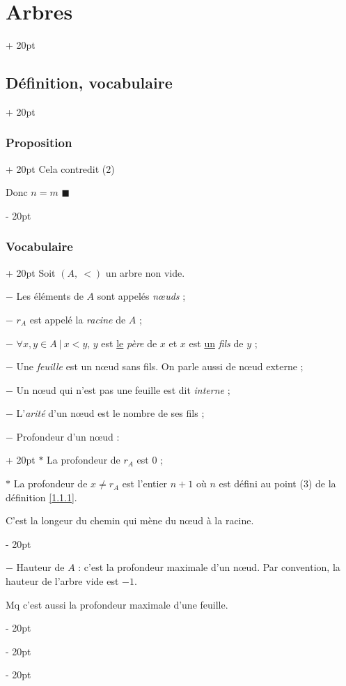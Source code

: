 \documentclass[a4paper, 12pt, twoside]{article}
\newcommand{\ind}[1][20pt]{\advance\leftskip + #1}
\newcommand{\deind}[1][20pt]{\advance\leftskip - #1}
\newenvironment{indt}[2][20pt]{#2 \par \ind[#1]}{\par \deind} %
\begin{document}
\begin{indt}{\section{Arbres}}
\begin{indt}{\subsection{Définition, vocabulaire}}
\begin{indt}{\subsubsection{Proposition}}
                Cela contredit (2)
                
                Donc $n = m$
                $\blacksquare$
            \end{indt}
            
            \vspace{12pt}
            
            \begin{indt}{\subsubsection{Vocabulaire}}
                Soit $(A,\ <)$ un arbre non vide.
                
                $-$ Les éléments de $A$ sont appelés \textit{n\oe uds} ;
                
                $-$ $r_A$ est appelé la \textit{racine} de $A$ ;
                
                $-$ $\forall x, y \in A \ |\ x < y$, $y$ est \underline{le} \textit{père} de $x$ et $x$ est \underline{un} \textit{fils} de $y$ ;
                
                $-$ Une \textit{feuille} est un n\oe ud sans fils. On parle aussi de n\oe ud externe ;
                
                $-$ Un n\oe ud qui n'est pas une feuille est dit \textit{interne} ;
                
                $-$ L'\textit{arité} d'un n\oe ud est le nombre de ses fils ;
                
                \begin{indt}{$-$ Profondeur d'un n\oe ud :}
                    $*$ La profondeur de $r_A$ est 0 ;
                    
                    $*$ La profondeur de $x \neq r_A$ est l'entier $n + 1$ où $n$ est défini au point (3) de la définition \ref{1.1.1}.
                    
                    C'est la longeur du chemin qui mène du n\oe ud à la racine.
                \end{indt}
                
                $-$ Hauteur de $A$ : c'est la profondeur maximale d'un n\oe ud. Par convention, la hauteur de l'arbre vide est $-1$.
                
                 Mq c'est aussi la profondeur maximale d'une feuille.
            \end{indt}
            

\end{indt}
\end{indt}
\end{document}

